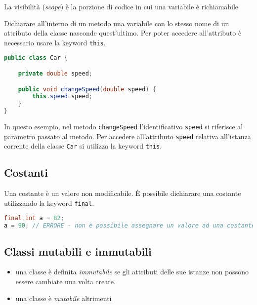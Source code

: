 \documentclass{article}
\begin{document}
\begin{mydef} La visibilità (\emph{scope}) è la porzione di codice in cui una variabile è richiamabile
\end{mydef}
Dichiarare all'interno di un metodo una variabile con lo stesso nome di un attributo della classe nasconde quest'ultimo.
Per poter accedere all'attributo è necessario usare la keyword \texttt{this}.
\begin{lstlisting}[language=Java,escapechar=|]
public class Car {

	private double speed;

	public void changeSpeed(double speed) {
        this.speed=speed;   
   	}
}
\end{lstlisting}
In questo esempio, nel metodo \texttt{changeSpeed} l'identificativo \texttt{speed} si riferisce al parametro passato al metodo.
Per accedere all'attributo \texttt{speed} relativa all'istanza corrente della classe \texttt{Car} si utilizza la keyword \texttt{this}. 

\subsection{Costanti}
Una costante è un valore non modificabile.
È possibile dichiarare una costante utilizzando la keyword
\texttt{final}. 

\begin{lstlisting}[language=Java,escapechar=|]
final int a = 82;
a = 90; // ERRORE - non è possibile assegnare un valore ad una costante
\end{lstlisting}

\subsection{Classi mutabili e immutabili}
\begin{itemize}
\item una classe è definita \emph{immutabile} se gli attributi delle sue istanze non possono essere cambiate una volta create.
\item una classe è \emph{mutabile} altrimenti
\end{itemize}
\end{document}
